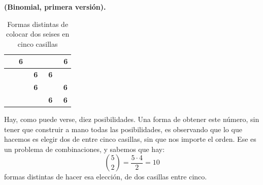 \begin{Ejemplo}{\bf (Binomial, primera versión).}
\begin{table}[ht]
\begin{center}
{\begin{tabular}{|c|c|c|c|c|}
         &\mbox{ \bf 6}& & & \mbox{ \bf 6}\\
        \hline
         && \mbox{ \bf 6}&\mbox{ \bf 6} & \\
         \hline
         && \mbox{ \bf 6}& & \mbox{ \bf 6} \\
         \hline
         &&& \mbox{ \bf 6}& \mbox{ \bf 6} \\
         \hline
        \end{tabular}
        }
        \caption{Formas distintas de colocar dos seises en cinco casillas}\label{cap05:tabla:FormasColocarDosSeisesCincoCasillas}
        \end{center}
        \end{table}
    Hay, como puede verse, diez posibilidades. Una forma de obtener este número, sin tener que construir a mano todas las posibilidades, es observando que lo que hacemos es elegir dos de entre cinco casillas, sin que nos importe el orden. Ese es un problema de combinaciones, y sabemos que hay:
         \[\binom{5}{2}=\dfrac{5\cdot 4}{2}=10\]
    formas distintas de hacer esa elección, de dos casillas entre cinco.


\end{Ejemplo}
